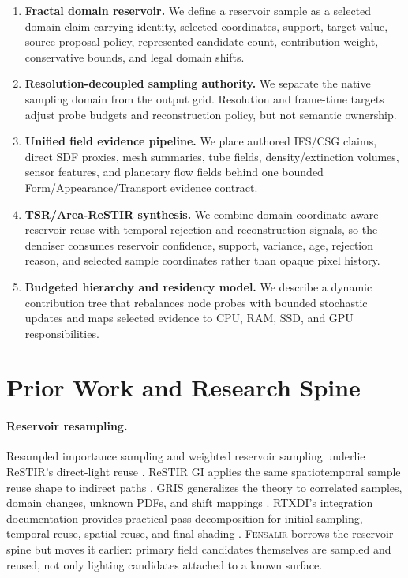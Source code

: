 \documentclass[11pt]{article}
\newcommand{\Fensalir}{\textsc{Fensalir}}
\newcommand{\ReSTIR}{ReSTIR}
\newcommand{\GRIS}{GRIS}
\begin{document}
\begin{enumerate}[leftmargin=1.5em]
  \item \textbf{Fractal domain reservoir.}  We define a reservoir sample as a
  selected domain claim carrying identity, selected coordinates, support,
  target value, source proposal policy, represented candidate count,
  contribution weight, conservative bounds, and legal domain shifts.

  \item \textbf{Resolution-decoupled sampling authority.}  We separate the
  native sampling domain from the output grid.  Resolution and frame-time
  targets adjust probe budgets and reconstruction policy, but not semantic
  ownership.

  \item \textbf{Unified field evidence pipeline.}  We place authored IFS/CSG
  claims, direct SDF proxies, mesh summaries, tube fields, density/extinction
  volumes, sensor features, and planetary flow fields behind one bounded
  Form/Appearance/Transport evidence contract.

  \item \textbf{TSR/Area-ReSTIR synthesis.}  We combine domain-coordinate-aware
  reservoir reuse with temporal rejection and reconstruction signals, so the
  denoiser consumes reservoir confidence, support, variance, age, rejection
  reason, and selected sample coordinates rather than opaque pixel history.

  \item \textbf{Budgeted hierarchy and residency model.}  We describe a dynamic
  contribution tree that rebalances node probes with bounded stochastic updates
  and maps selected evidence to CPU, RAM, SSD, and GPU responsibilities.
\end{enumerate}

\section{Prior Work and Research Spine}

\paragraph{Reservoir resampling.}
Resampled importance sampling and weighted reservoir sampling underlie
\ReSTIR's direct-light reuse \cite{bitterli2020restir}.  \ReSTIR{} GI applies
the same spatiotemporal sample reuse shape to indirect paths
\cite{ouyang2021restirgi}.  \GRIS{} generalizes the theory to correlated
samples, domain changes, unknown PDFs, and shift mappings \cite{lin2022gris}.
RTXDI's integration documentation provides practical pass decomposition for
initial sampling, temporal reuse, spatial reuse, and final shading
\cite{rtxdiRestirGI,rtxdiRestirPT}.  \Fensalir{} borrows the reservoir spine
but moves it earlier: primary field candidates themselves are sampled and
reused, not only lighting candidates attached to a known surface.
\end{document}
